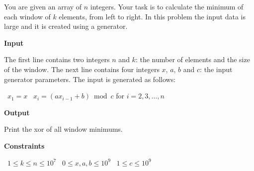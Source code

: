 You are given an array of $n$ integers. Your task is to calculate the minimum of each window of $k$ elements, from left to right.
In this problem the input data is large and it is created using a generator.

\vspace{0.3cm}\noindent\textbf{Input}

The first line contains two integers $n$ and $k$: the number of elements and the size of the window.
The next line contains four integers $x$, $a$, $b$ and $c$: the input generator parameters. The input is generated as follows:

\textbullet\ $x_1=x$
\textbullet\ $x_i=(ax_{i-1}+b) \bmod c$ for $i=2,3,\dots,n$

\vspace{0.3cm}\noindent\textbf{Output}

Print the xor of all window minimums.

\vspace{0.3cm}\noindent\textbf{Constraints}

\textbullet\ $1 \le k \le n \le 10^7$
\textbullet\ $0 \le x, a, b \le 10^9$
\textbullet\ $1 \le c \le 10^9$